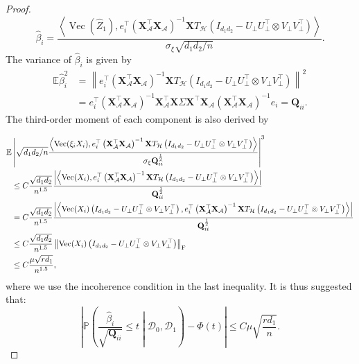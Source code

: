 \documentclass[12pt]{article}
\newcommand{\Vect}{\operatorname{Vec} }
\newcommand{\tF}{{\rm F}}
\newcommand{\abs}[1]{\left\lvert#1\right\rvert}
\newcommand{\norm}[1]{\left\lVert#1\right\rVert}
\newcommand{\PP}{\mathbb{P}}
\newcommand{\E}{\mathbb{E}}
\newcommand{\cD}{\mathcal{D}}
\def\calH{{\mathcal H}}
\def\PP{{\mathbb P}}
\theoremstyle{plain}
\begin{document}
\begin{proof}
\begin{equation}
   \widehat{\beta}_i= \frac{\left\langle \Vect(\widehat{Z}_1),  e_i^\top \left(\mathbf{X}_{\mathcal{A}}^{\top} \mathbf{X}_{\mathcal{A}}\right)^{-1} \mathbf{X} T_{\calH} \left(I_{d_1 d_2} -  U_\perp U_\perp^\top \otimes V_\perp V_\perp^\top\right) \right\rangle }{\sigma_\xi  \sqrt{d_1 d_2/n} }.
\end{equation}
The variance of $\widehat{\beta}_i$ is given by 
\begin{equation*}
\begin{aligned}
     \E  \widehat{\beta}_i^2& = \norm{e_i^\top \left(\mathbf{X}_{\mathcal{A}}^{\top} \mathbf{X}_{\mathcal{A}}\right)^{-1} \mathbf{X} T_{\calH} \left(I_{d_1 d_2} -  U_\perp U_\perp^\top \otimes V_\perp V_\perp^\top\right)}^2 \\
    &=  e_i^\top\left(\mathbf{X}_{\mathcal{A}}^{\top} \mathbf{X}_{\mathcal{A}}\right)^{-1} \mathbf{X}_{\mathcal{A}}^{\top} \mathbf{X} \Sigma  \mathbf{X}^{\top} \mathbf{X}_{\mathcal{A}}\left(\mathbf{X}_{\mathcal{A}}^{\top} \mathbf{X}_{\mathcal{A}}\right)^{-1} e_i=\mathbf{Q}_{ii}.
\end{aligned}
\end{equation*}
The third-order moment of each component is also derived by 

\begin{equation*}
\begin{aligned}
     \E & \abs{\sqrt{d_1 d_2/n}\frac{\left\langle \Vect(\xi_i X_i),  e_i^\top \left(\mathbf{X}_{\mathcal{A}}^{\top} \mathbf{X}_{\mathcal{A}}\right)^{-1} \mathbf{X} T_{\calH} \left(I_{d_1 d_2} -  U_\perp U_\perp^\top \otimes V_\perp V_\perp^\top\right) \right\rangle }{\sigma_\xi \mathbf{Q}_{ii}^{\frac{1}{2}}  }}^3 \\
     & \le C\frac{\sqrt{d_1 d_2}}{n^{1.5} }\frac{ \abs{\left\langle \Vect( X_i),  e_i^\top \left(\mathbf{X}_{\mathcal{A}}^{\top} \mathbf{X}_{\mathcal{A}}\right)^{-1} \mathbf{X} T_{\calH} \left(I_{d_1 d_2} -  U_\perp U_\perp^\top \otimes V_\perp V_\perp^\top\right) \right\rangle}  }{\mathbf{Q}_{ii}^{\frac{1}{2}} } \\
     & = C\frac{\sqrt{d_1 d_2}}{n^{1.5} }\frac{ \abs{\left\langle \Vect( X_i)\left(I_{d_1 d_2} -  U_\perp U_\perp^\top \otimes V_\perp V_\perp^\top\right) ,  e_i^\top \left(\mathbf{X}_{\mathcal{A}}^{\top} \mathbf{X}_{\mathcal{A}}\right)^{-1} \mathbf{X} T_{\calH} \left(I_{d_1 d_2} -  U_\perp U_\perp^\top \otimes V_\perp V_\perp^\top\right) \right\rangle}  }{\mathbf{Q}_{ii}^{\frac{1}{2}} } \\
     &\le C\frac{\sqrt{d_1 d_2}}{n^{1.5}} \norm{\Vect( X_i)\left(I_{d_1 d_2} -  U_\perp U_\perp^\top \otimes V_\perp V_\perp^\top\right)  }_\tF \\
    &\le  C \frac{\mu \sqrt{r d_1}}{n^{1.5}},
\end{aligned}
\end{equation*}
where we use the incoherence condition in the last inequality. It is thus suggested that:
\begin{equation}
    \abs{ \PP\left(\frac{\widehat{\beta}_i}{\sqrt{\mathbf{Q}_{ii}}  } \le t \middle| \cD_0,\cD_1\right) - \Phi(t) } \le C\mu \sqrt{\frac{r d_1}{n}}.
\end{equation}


\end{proof}
\end{document}
